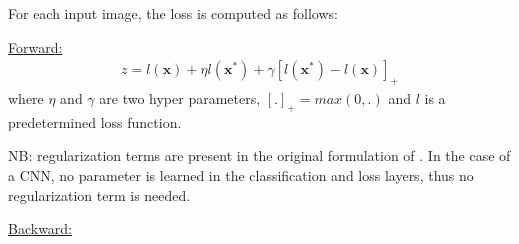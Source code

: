 For each input image, the loss is computed as follows: 

  \begin{center}
  \end{center}

\noindent
\underline{Forward:} 
\begin{align}
 z = l(\mathbf{x}) + \eta l(\mathbf{x^*}) + \gamma [ l(\mathbf{x^*}) - l(\mathbf{x}) ]_+ \nonumber 
\end{align}
where $\eta$ and $\gamma$ are two hyper parameters, $[.]_+ = max(0,.)$ and $l$ is a predetermined loss function. 

NB: regularization terms are present in the original formulation of \cite{WangCVPR15hiddeninfo}. In the case of a CNN, no parameter is learned in the classification and loss layers, thus no regularization term is needed. 

\vspace{0.3cm}

\noindent
\underline{Backward:} 

\vspace{0.3cm}

